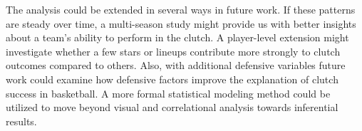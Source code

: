 \begin{sloppypar}
The analysis could be extended in several ways in future work. If these patterns are steady over time, a multi-season study might provide us with better insights about a team's ability to perform in the clutch. A player-level extension might investigate whether a few stars or lineups contribute more strongly to clutch outcomes compared to others. Also, with additional defensive variables future work could examine how defensive factors improve the explanation of clutch success in basketball. A more formal statistical modeling method could be utilized to move beyond visual and correlational analysis towards inferential results.
\end{sloppypar}
